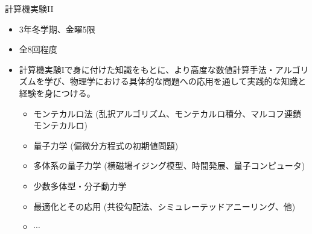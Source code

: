 \documentclass[10pt,dvipdfmx]{beamer}
\begin{document}
\begin{frame}[t,fragile]{計算機実験II}
  \begin{itemize}
  \item 3年冬学期、金曜5限
  \item 全8回程度
  \item 計算機実験Iで身に付けた知識をもとに、より高度な数値計算手法・アルゴリズムを学び、物理学における具体的な問題への応用を通して実践的な知識と経験を身につける。
    \begin{itemize}
      \item モンテカルロ法 (乱択アルゴリズム、モンテカルロ積分、マルコフ連鎖モンテカルロ)
      \item 量子力学 (偏微分方程式の初期値問題)
      \item 多体系の量子力学 (横磁場イジング模型、時間発展、量子コンピュータ)
      \item 少数多体型・分子動力学
      \item 最適化とその応用 (共役勾配法、シミュレーテッドアニーリング、他)
      \item $\cdots$
    \end{itemize}
  \end{itemize}
\end{frame}
\end{document}

